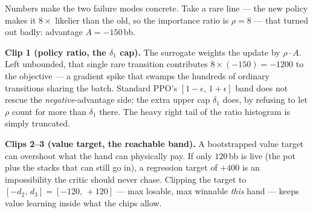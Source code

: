 \documentclass[11pt,a4paper]{article}
\begin{document}
Numbers make the two failure modes concrete. Take a rare line --- the new policy
makes it $8\times$ likelier than the old, so the importance ratio is $\rho=8$ ---
that turned out badly: advantage $A=-150$\,bb.

\textbf{Clip 1 (policy ratio, the $\delta_1$ cap).} The surrogate weights the
update by $\rho\cdot A$. Left unbounded, that single rare transition contributes
$8\times(-150)=-1200$ to the objective --- a gradient spike that swamps the
hundreds of ordinary transitions sharing the batch. Standard PPO's
$[1{-}\epsilon,\,1{+}\epsilon]$ band does not rescue the \emph{negative}-advantage
side; the extra upper cap $\delta_1$ does, by refusing to let $\rho$ count for
more than $\delta_1$ there. The heavy right tail of the ratio histogram is simply
truncated.

\textbf{Clips 2--3 (value target, the reachable band).} A bootstrapped value
target can overshoot what the hand can physically pay. If only $120$\,bb is live
(the pot plus the stacks that can still go in), a regression target of $+400$ is
an impossibility the critic should never chase. Clipping the target to
$[-d_2,\,d_3]=[-120,\,+120]$ --- max losable, max winnable \emph{this} hand ---
keeps value learning inside what the chips allow.

\begin{center}
\end{center}
\end{document}
